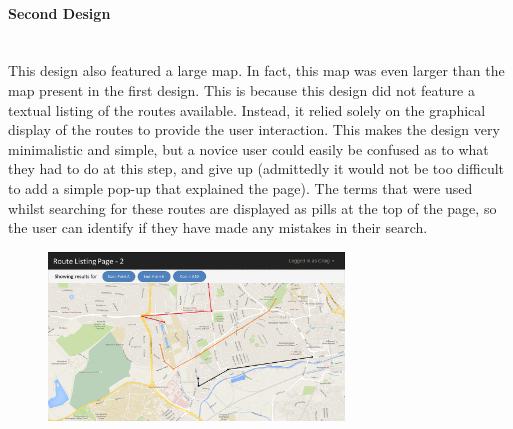 \documentclass[a4paper,twoside,notitlepage,11pt]{article}
\begin{document}
\paragraph{Second Design}\ \\
This design also featured a large map. In fact, this map was even larger than the map present in the first design. This is because this design did not feature a textual listing of the routes available. Instead, it relied solely on the graphical display of the routes to provide the user interaction. This makes the design very minimalistic and simple, but a novice user could easily be confused as to what they had to do at this step, and give up (admittedly it would not be too difficult to add a simple pop-up that explained the page). The terms that were used whilst searching for these routes are displayed as pills at the top of the page, so the user can identify if they have made any mistakes in their search.

\begin{figure}[!ht]
	\begin{center}
		\includegraphics[width=0.7\textwidth]{images/ui-rlp-2.png}
	\end{center}
	\vspace{-9mm}
\end{figure}
\end{document}
